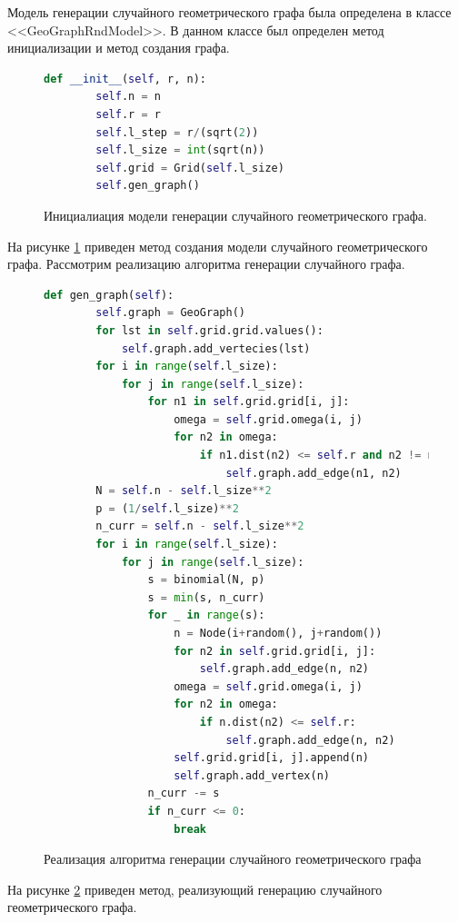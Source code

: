 Модель генерации случайного геометрического графа была 
определена в классе <<GeoGraphRndModel>>. В данном 
классе был определен метод инициализации и метод создания графа.
\begin{figure}[H] 
\begin{lstlisting}[language=Python] 
    def __init__(self, r, n):
        self.n = n
        self.r = r
        self.l_step = r/(sqrt(2))
        self.l_size = int(sqrt(n))
        self.grid = Grid(self.l_size)
        self.gen_graph()
\end{lstlisting}  
    \caption{Инициалиация модели генерации случайного геометрического графа.}
    \label{geornd1}
\end{figure} 
На рисунке \ref{geornd1} приведен метод создания 
модели случайного геометрического графа. Рассмотрим
реализацию алгоритма генерации случайного графа.
\begin{figure}[H] 
\begin{lstlisting}[language=Python] 
    def gen_graph(self):
        self.graph = GeoGraph()
        for lst in self.grid.grid.values():
            self.graph.add_vertecies(lst)
        for i in range(self.l_size):
            for j in range(self.l_size):
                for n1 in self.grid.grid[i, j]:
                    omega = self.grid.omega(i, j)
                    for n2 in omega:
                        if n1.dist(n2) <= self.r and n2 != n1:
                            self.graph.add_edge(n1, n2)
        N = self.n - self.l_size**2
        p = (1/self.l_size)**2
        n_curr = self.n - self.l_size**2
        for i in range(self.l_size):
            for j in range(self.l_size):
                s = binomial(N, p)
                s = min(s, n_curr)
                for _ in range(s):
                    n = Node(i+random(), j+random())
                    for n2 in self.grid.grid[i, j]:
                        self.graph.add_edge(n, n2)
                    omega = self.grid.omega(i, j)
                    for n2 in omega:
                        if n.dist(n2) <= self.r:
                            self.graph.add_edge(n, n2)
                    self.grid.grid[i, j].append(n)
                    self.graph.add_vertex(n)
                n_curr -= s
                if n_curr <= 0:
                    break
\end{lstlisting}  
    \caption{Реализация алгоритма генерации случайного геометрического
    графа}
    \label{geornd2}
\end{figure} 
На рисунке \ref{geornd2} приведен метод, 
реализующий генерацию случайного геометрического графа.


